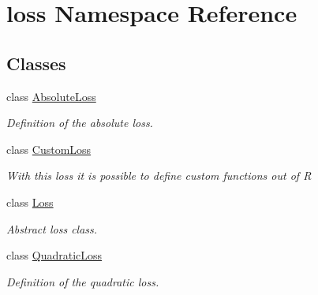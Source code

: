 \hypertarget{namespaceloss}{}\section{loss Namespace Reference}
\label{namespaceloss}
\subsection*{Classes}
\begin{DoxyCompactItemize}
\item 
class \mbox{\hyperlink{classloss_1_1_absolute_loss}{Absolute\+Loss}}
\begin{DoxyCompactList}\small\item\em Definition of the absolute loss. \end{DoxyCompactList}\item 
class \mbox{\hyperlink{classloss_1_1_custom_loss}{Custom\+Loss}}
\begin{DoxyCompactList}\small\item\em With this loss it is possible to define custom functions out of {\ttfamily R} \end{DoxyCompactList}\item 
class \mbox{\hyperlink{classloss_1_1_loss}{Loss}}
\begin{DoxyCompactList}\small\item\em Abstract loss class. \end{DoxyCompactList}\item 
class \mbox{\hyperlink{classloss_1_1_quadratic_loss}{Quadratic\+Loss}}
\begin{DoxyCompactList}\small\item\em Definition of the quadratic loss. \end{DoxyCompactList}\end{DoxyCompactItemize}
